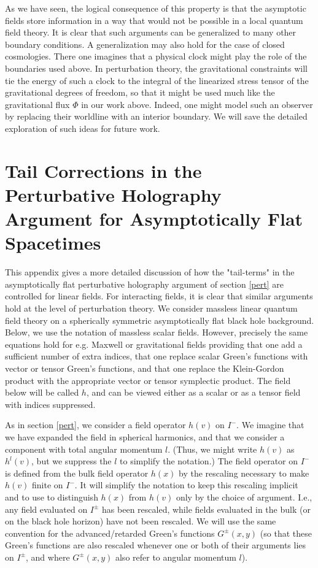 \documentclass[12pt,onecolumn,eqsecnum,aps,prd,nofootinbib]{revtex4}
\begin{document}
As we have seen, the logical consequence of this property is that
the asymptotic fields store information in a way that would not be
possible in a local quantum field theory.  It is clear that such
arguments can be generalized to many other boundary conditions.
A generalization may also hold for the case of closed cosmologies.  There one imagines
that a physical clock might play the role of the boundaries used
above.  In perturbation theory, the gravitational constraints will
tie the energy of such a clock to the integral of the linearized
stress tensor of the gravitational degrees of freedom, so that it
might be used much like the gravitational flux $\Phi$ in our work
above.  Indeed, one might model such an observer by replacing their
worldline with an interior boundary.  We will save the detailed
exploration of such ideas for future work.


\appendix

\section{Tail Corrections in the Perturbative Holography Argument for Asymptotically Flat Spacetimes}
\label{app}

This appendix gives a more detailed discussion of how the "tail-terms" in the asymptotically flat perturbative holography argument of section \ref{pert}  are controlled for linear fields.  For interacting fields, it is clear that similar arguments hold at the level of perturbation theory.  We consider massless linear quantum field theory on a spherically symmetric asymptotically flat black hole background.  Below, we use the notation of massless scalar fields.  However, precisely the same equations hold for e.g. Maxwell or gravitational fields providing that one add a sufficient number of extra indices, that one replace scalar Green's functions with vector or tensor Green's functions, and that one replace the Klein-Gordon product with the appropriate vector or tensor symplectic product.  The field below will be called $h$, and can be viewed either as a scalar or as a tensor field with indices suppressed.

As in section \ref{pert}, we consider a field operator $h(v)$ on $I^-$.  We imagine that we have expanded the field in spherical harmonics, and that we consider a component with total angular momentum $l$.  (Thus, we might write $h(v)$ as $h^l(v)$, but we suppress the $l$ to simplify the notation.)
The field operator on $I^-$ is defined from the bulk field operator $h(x)$ by the rescaling necessary to make $h(v)$ finite on $I^-$.  It will simplify the notation to keep this rescaling implicit and to use to distinguish $h(x)$ from $h(v)$ only by the choice of argument.  I.e., any field evaluated on $I^\pm$ has been rescaled, while fields evaluated in the bulk (or on the black hole horizon) have not been rescaled.  We will use the same convention for the advanced/retarded Green's functions $G^\pm(x,y)$ (so that these Green's functions are also rescaled whenever one or both of their arguments lies on $I^\pm$, and where $G^\pm(x,y)$ also refer to angular momentum $l$).
\end{document}
